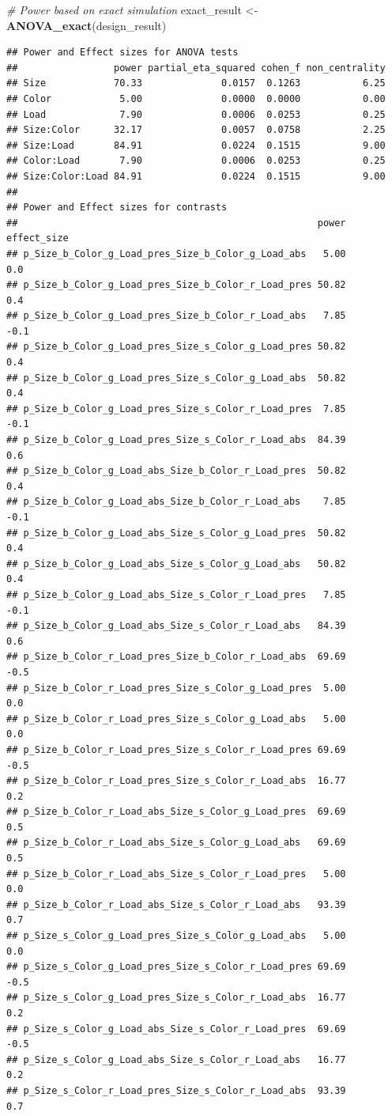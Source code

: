 \documentclass[]{book}
\newenvironment{Shaded}{\begin{snugshade}}{\end{snugshade}}
\newcommand{\CommentTok}[1]{\textcolor[rgb]{0.56,0.35,0.01}{\textit{#1}}}
\newcommand{\KeywordTok}[1]{\textcolor[rgb]{0.13,0.29,0.53}{\textbf{#1}}}
\newcommand{\NormalTok}[1]{#1}
\newcommand{\StringTok}[1]{\textcolor[rgb]{0.31,0.60,0.02}{#1}}
\begin{document}
\begin{Shaded}
\begin{Highlighting}[]
\CommentTok{# Power based on exact simulation}
\NormalTok{exact_result <-}\StringTok{ }\KeywordTok{ANOVA_exact}\NormalTok{(design_result)}
\end{Highlighting}
\end{Shaded}

\begin{verbatim}
## Power and Effect sizes for ANOVA tests
##                 power partial_eta_squared cohen_f non_centrality
## Size            70.33              0.0157  0.1263           6.25
## Color            5.00              0.0000  0.0000           0.00
## Load             7.90              0.0006  0.0253           0.25
## Size:Color      32.17              0.0057  0.0758           2.25
## Size:Load       84.91              0.0224  0.1515           9.00
## Color:Load       7.90              0.0006  0.0253           0.25
## Size:Color:Load 84.91              0.0224  0.1515           9.00
## 
## Power and Effect sizes for contrasts
##                                                     power effect_size
## p_Size_b_Color_g_Load_pres_Size_b_Color_g_Load_abs   5.00         0.0
## p_Size_b_Color_g_Load_pres_Size_b_Color_r_Load_pres 50.82         0.4
## p_Size_b_Color_g_Load_pres_Size_b_Color_r_Load_abs   7.85        -0.1
## p_Size_b_Color_g_Load_pres_Size_s_Color_g_Load_pres 50.82         0.4
## p_Size_b_Color_g_Load_pres_Size_s_Color_g_Load_abs  50.82         0.4
## p_Size_b_Color_g_Load_pres_Size_s_Color_r_Load_pres  7.85        -0.1
## p_Size_b_Color_g_Load_pres_Size_s_Color_r_Load_abs  84.39         0.6
## p_Size_b_Color_g_Load_abs_Size_b_Color_r_Load_pres  50.82         0.4
## p_Size_b_Color_g_Load_abs_Size_b_Color_r_Load_abs    7.85        -0.1
## p_Size_b_Color_g_Load_abs_Size_s_Color_g_Load_pres  50.82         0.4
## p_Size_b_Color_g_Load_abs_Size_s_Color_g_Load_abs   50.82         0.4
## p_Size_b_Color_g_Load_abs_Size_s_Color_r_Load_pres   7.85        -0.1
## p_Size_b_Color_g_Load_abs_Size_s_Color_r_Load_abs   84.39         0.6
## p_Size_b_Color_r_Load_pres_Size_b_Color_r_Load_abs  69.69        -0.5
## p_Size_b_Color_r_Load_pres_Size_s_Color_g_Load_pres  5.00         0.0
## p_Size_b_Color_r_Load_pres_Size_s_Color_g_Load_abs   5.00         0.0
## p_Size_b_Color_r_Load_pres_Size_s_Color_r_Load_pres 69.69        -0.5
## p_Size_b_Color_r_Load_pres_Size_s_Color_r_Load_abs  16.77         0.2
## p_Size_b_Color_r_Load_abs_Size_s_Color_g_Load_pres  69.69         0.5
## p_Size_b_Color_r_Load_abs_Size_s_Color_g_Load_abs   69.69         0.5
## p_Size_b_Color_r_Load_abs_Size_s_Color_r_Load_pres   5.00         0.0
## p_Size_b_Color_r_Load_abs_Size_s_Color_r_Load_abs   93.39         0.7
## p_Size_s_Color_g_Load_pres_Size_s_Color_g_Load_abs   5.00         0.0
## p_Size_s_Color_g_Load_pres_Size_s_Color_r_Load_pres 69.69        -0.5
## p_Size_s_Color_g_Load_pres_Size_s_Color_r_Load_abs  16.77         0.2
## p_Size_s_Color_g_Load_abs_Size_s_Color_r_Load_pres  69.69        -0.5
## p_Size_s_Color_g_Load_abs_Size_s_Color_r_Load_abs   16.77         0.2
## p_Size_s_Color_r_Load_pres_Size_s_Color_r_Load_abs  93.39         0.7
\end{verbatim}
\end{document}

